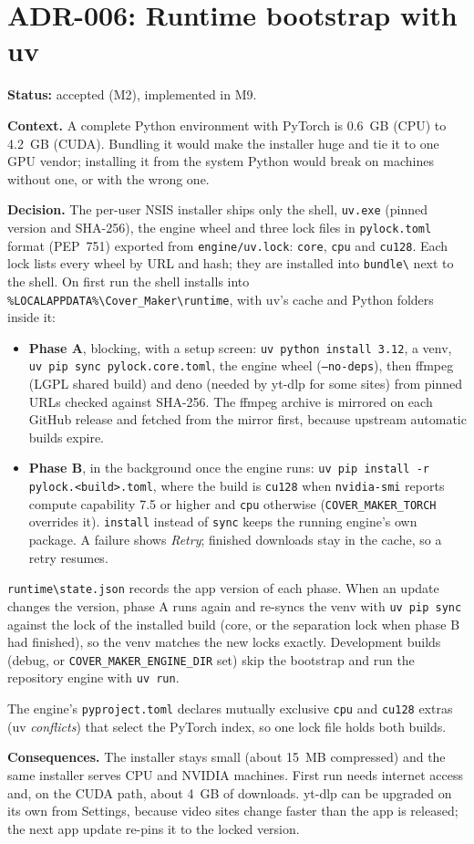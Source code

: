\section{ADR-006: Runtime bootstrap with uv}
\textbf{Status:} accepted (M2), implemented in M9.

\textbf{Context.} A complete Python environment with PyTorch is 0.6~GB (CPU)
to 4.2~GB (CUDA). Bundling it would make the installer huge and tie it to one
GPU vendor; installing it from the system Python would break on machines
without one, or with the wrong one.

\textbf{Decision.} The per-user NSIS installer ships only the shell,
\texttt{uv.exe} (pinned version and SHA-256), the engine wheel and three lock
files in \texttt{pylock.toml} format (PEP~751) exported from
\texttt{engine/uv.lock}: \texttt{core}, \texttt{cpu} and \texttt{cu128}. Each
lock lists every wheel by URL and hash; they are installed into
\texttt{bundle\textbackslash} next to the shell. On first run the shell installs into
\texttt{\%LOCALAPPDATA\%\textbackslash Cover\_Maker\textbackslash runtime}, with
uv's cache and Python folders inside it:
\begin{itemize}
  \item \textbf{Phase A}, blocking, with a setup screen: \texttt{uv python
  install 3.12}, a venv, \texttt{uv pip sync pylock.core.toml}, the engine
  wheel (\texttt{--no-deps}), then ffmpeg (LGPL shared build) and deno
  (needed by yt-dlp for some sites) from pinned URLs checked against SHA-256.
  The ffmpeg archive is mirrored on each GitHub release and fetched from the
  mirror first, because upstream automatic builds expire.
  \item \textbf{Phase B}, in the background once the engine runs:
  \texttt{uv pip install -r pylock.<build>.toml}, where the build is
  \texttt{cu128} when \texttt{nvidia-smi} reports compute capability 7.5 or
  higher and \texttt{cpu} otherwise (\texttt{COVER\_MAKER\_TORCH} overrides
  it). \texttt{install} instead of \texttt{sync} keeps the running engine's
  own package. A failure shows \emph{Retry}; finished downloads stay in the
  cache, so a retry resumes.
\end{itemize}
\texttt{runtime\textbackslash state.json} records the app version of each
phase. When an update changes the version, phase A runs again and re-syncs the
venv with \texttt{uv pip sync} against the lock of the installed build (core,
or the separation lock when phase B had finished), so the venv matches the new
locks exactly. Development builds (debug, or \texttt{COVER\_MAKER\_ENGINE\_DIR}
set) skip the bootstrap and run the repository engine with \texttt{uv run}.

The engine's \texttt{pyproject.toml} declares mutually exclusive \texttt{cpu}
and \texttt{cu128} extras (uv \emph{conflicts}) that select the PyTorch index,
so one lock file holds both builds.

\textbf{Consequences.} The installer stays small (about 15~MB compressed) and
the same installer serves CPU and NVIDIA machines. First run needs internet
access and, on the CUDA path, about 4~GB of downloads. yt-dlp can be upgraded
on its own from Settings, because video sites change faster than the app is
released; the next app update re-pins it to the locked version.
